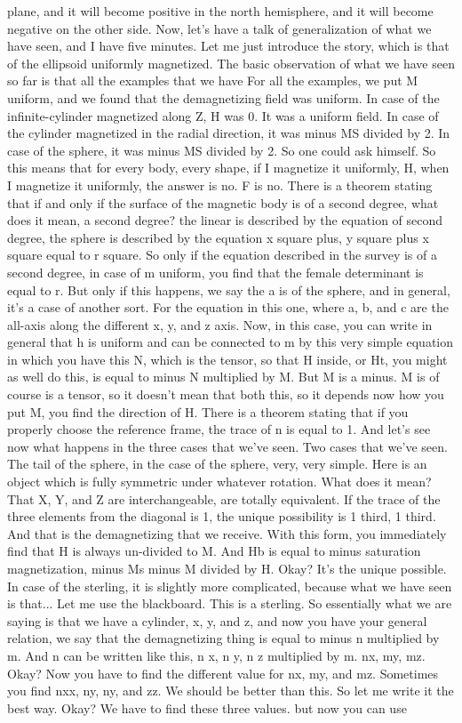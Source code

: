 plane, and it will become positive in the north hemisphere, and it will become negative on the other side.
Now, let's have a talk of generalization of what we have seen, and I have five minutes. Let me just introduce the story, which is that of the ellipsoid uniformly magnetized. The basic observation of what we have seen so far is that all the examples that we have For all the examples, we put M uniform, and we found that the demagnetizing field was uniform. In case of the infinite-cylinder magnetized along Z, H was 0. It was a uniform field. In case of the cylinder magnetized in the radial direction, it was minus MS divided by 2. In case of the sphere, it was minus MS divided by 2. So one could ask himself. So this means that for every body, every shape, if I magnetize it uniformly, H, when I magnetize it uniformly, the answer is no. F is no. There is a theorem stating that if and only if the surface of the magnetic body is of a second degree, what does it mean, a second degree? the linear is described by the equation of second degree, the sphere is described by the equation x square plus, y square plus x square equal to r square. So only if the equation described in the survey is of a second degree, in case of m uniform, you find that the female determinant is equal to r. But only if this happens, we say the a is of the sphere, and in general, it's a case of another sort. For the equation in this one, where a, b, and c are the all-axis along the different x, y, and z axis. Now, in this case, you can write in general that h is uniform and can be connected to m by this very simple equation in which you have this N, which is the tensor, so that H inside, or Ht, you might as well do this, is equal to minus N multiplied by M. But M is a minus. M is of course is a tensor, so it doesn't mean that both this, so it depends now how you put M, you find the direction of H. There is a theorem stating that if you properly choose the reference frame, the trace of n is equal to 1. And let's see now what happens in the three cases that we've seen. Two cases that we've seen. The tail of the sphere, in the case of the sphere, very, very simple. Here is an object which is fully symmetric under whatever rotation. What does it mean? That X, Y, and Z are interchangeable, are totally equivalent. If the trace of the three elements from the diagonal is 1, the unique possibility is 1 third, 1 third. And that is the demagnetizing that we receive. With this form, you immediately find that H is always un-divided to M. And Hb is equal to minus saturation magnetization, minus Ms minus M divided by H. Okay? It's the unique possible. In case of the sterling, it is slightly more complicated, because what we have seen is that... Let me use the blackboard. This is a sterling. So essentially what we are saying is that we have a cylinder, x, y, and z, and now you have your general relation, we say that the demagnetizing thing is equal to minus n multiplied by m. And n can be written like this, n x, n y, n z multiplied by m. nx, my, mz. Okay? Now you have to find the different value for nx, my, and mz. Sometimes you find nxx, ny, ny, and zz. We should be better than this. So let me write it the best way. Okay? We have to find these three values. but now you can use 